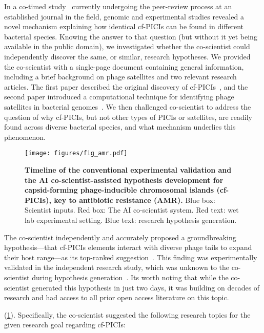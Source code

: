 In a co-timed study~\citep{he2023large} currently undergoing the peer-review process at an established journal in the field, genomic and experimental studies revealed a novel mechanism explaining how identical cf-PICIs can be found in different bacterial species. Knowing the answer to that question (but without it yet being available in the public domain), we investigated whether the co-scientist could independently discover the same, or similar, research hypotheses. We provided the co-scientist with a single-page document containing general information, including a brief background on phage satellites and two relevant research articles. The first paper described the original discovery of cf-PICIs~\citep{alqurainy2023widespread}, and the second paper introduced a computational technique for identifying phage satellites in bacterial genomes~\citep{de2023identification}. We then challenged co-scientist to address the question of why cf-PICIs, but not other types of PICIs or satellites, are readily found across diverse bacterial species, and what mechanism underlies this phenomenon.

\begin{figure}[ht!]
\centering
\texttt{[image: figures/fig\_amr.pdf]}
\vspace{0.1cm}
\caption{\textbf{Timeline of the conventional experimental validation and the AI co-scientist-assisted hypothesis development for capsid-forming phage-inducible chromosomal islands (cf-PICIs), key to antibiotic resistance (AMR).} Blue box: Scientist inputs. Red box: The AI co-scientist system. Red text: wet lab experimental setting. Blue text: research hypothesis generation.}
\label{fig:fig_amr}
\end{figure}
\vspace{-0.3cm}

The co-scientist independently and accurately proposed a groundbreaking hypothesis---that cf-PICIs elements interact with diverse phage tails to expand their host range---as its top-ranked suggestion~\citep{penades2025ai}. This finding was experimentally validated in the independent research study, which was unknown to the co-scientist during hypothesis generation~\cite{he2025chimeric}. Its worth noting that while the co-scientist generated this hypothesis in just two days, it was building on decades of research and had access to all prior open access literature on this topic.

(\cref{fig:fig_amr}). Specifically, the co-scientist suggested the following research topics for the given research goal regarding cf-PICIs:


